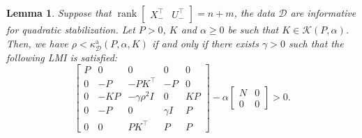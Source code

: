 \documentclass[9pt,shortpaper,twoside,web]{ieeecolor}
\DeclareMathOperator{\rank}{rank}
\newcommand{\mac}[1]{\mathcal{#1}}
\newtheorem{lemma}[theorem]{Lemma}
\begin{document}
\begin{lemma}
\label{lem:dd_slem}
Suppose that $\rank\begin{bmatrix}
        X^\top_- & U^\top_-
    \end{bmatrix}=n+m$, the data $\mac{D}$ are informative for quadratic stabilization. Let $P>0$, $K$ and $\alpha \geq 0$ be such that $K \in \mathcal{K}(P,\alpha)$. Then, we have $\rho<\kappa_{\mathcal{D}}^{\text{a}}(P,\alpha,K)$ \emph{if and only if} there exists $\gamma > 0$ such that the following LMI is satisfied:
     \begin{equation}
    \label{eq:SDP_add_lambda_s_s_K}
        \begin{bmatrix}
            P & 0 & 0 & 0 & 0\\
            0 & -P & -PK^\top & -P & 0\\
            0 & -KP & -\gamma\rho^2 I & 0 & KP\\
            0 & -P & 0 & \gamma I & P\\
            0 & 0 & PK^\top & P & P 
        \end{bmatrix}-\alpha\begin{bmatrix}
            N & 0 \\ 0 & 0
        \end{bmatrix} > 0.
\end{equation}
\end{lemma}
\end{document}
